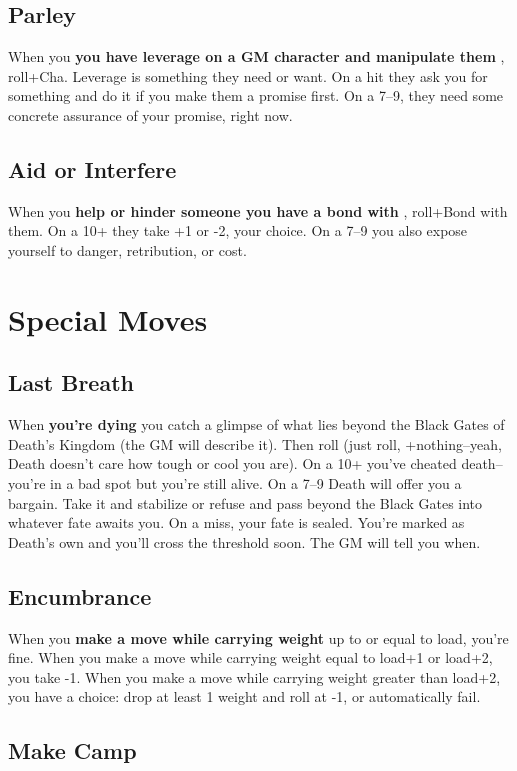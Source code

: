 \subsection{Parley}


 When you \textbf{you have leverage on a GM character and manipulate them}
, roll+Cha. Leverage is something they need or want. On a hit they ask you for something and do it if you make them a promise first. On a 7--9, they need some concrete assurance of your promise, right now.
\subsection{Aid or Interfere}


 When you \textbf{help or hinder someone you have a bond with}
, roll+Bond with them. On a 10+ they take +1 or -2, your choice. On a 7--9 you also expose yourself to danger, retribution, or cost.
\section{Special Moves}
\subsection{Last Breath}


 When \textbf{you're dying}
 you catch a glimpse of what lies beyond the Black Gates of Death's Kingdom (the GM will describe it). Then roll (just roll, +nothing--yeah, Death doesn't care how tough or cool you are). On a 10+ you've cheated death--you're in a bad spot but you're still alive. On a 7--9 Death will offer you a bargain. Take it and stabilize or refuse and pass beyond the Black Gates into whatever fate awaits you. On a miss, your fate is sealed. You're marked as Death's own and you'll cross the threshold soon. The GM will tell you when.
\subsection{Encumbrance}


 When you \textbf{make a move while carrying weight}
 up to or equal to load, you're fine. When you make a move while carrying weight equal to load+1 or load+2, you take -1. When you make a move while carrying weight greater than load+2, you have a choice: drop at least 1 weight and roll at -1, or automatically fail.
\subsection{Make Camp}


